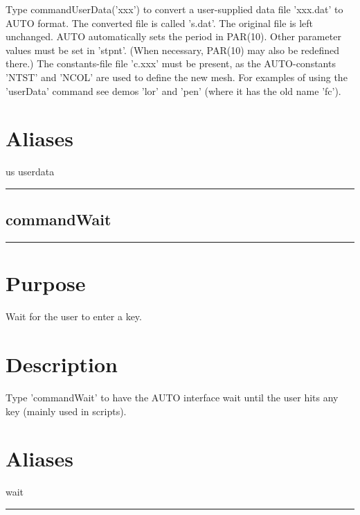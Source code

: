 \documentclass[12pt]{report}
\begin{document}
\begin{minipage}{6in}
    Type commandUserData('xxx') to convert a user-supplied data file 'xxx.dat' to
    AUTO format. The converted file is called 's.dat'.  The original
    file is left unchanged.  AUTO automatically sets the period in
    PAR(10).  Other parameter values must be set in 'stpnt'. (When
    necessary, PAR(10) may also be redefined there.)  The
    constants-file file 'c.xxx' must be present, as the AUTO-constants
    'NTST' and 'NCOL' are used to define the new mesh.  For examples
    of using the 'userData' command see demos 'lor' and 'pen' (where
    it has the old name 'fc').
    \section*{Aliases}
us userdata \medskip\hrule\end{minipage}\subsection{commandWait} \label{sec:clui_ref_commandWait}\begin{minipage}{6in}\hrule\medskip\section*{Purpose}
Wait for the user to enter a key.\section*{Description}

    Type 'commandWait' to have the AUTO interface wait
    until the user hits any key (mainly used in scripts).
    \section*{Aliases}
wait \medskip\hrule\end{minipage}


\end{document}
